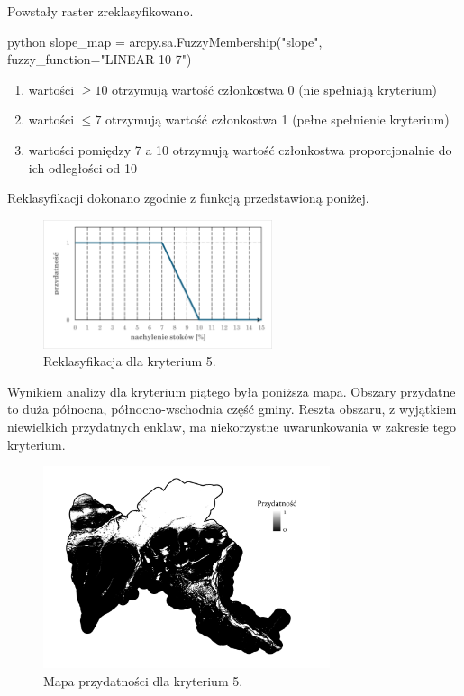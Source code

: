 \documentclass{article}
\begin{document}
Powstały raster zreklasyfikowano.
\vspace{5pt}

\begin{mintedbox}{python}
slope_map = arcpy.sa.FuzzyMembership("slope", fuzzy_function="LINEAR 10 7")
\end{mintedbox}

\begin{enumerate}[label=•]
    \item wartości \( \geq 10 \) otrzymują wartość członkostwa 0 (nie spełniają kryterium)
    \item wartości \( \leq 7 \) otrzymują wartość członkostwa 1 (pełne spełnienie kryterium)
    \item wartości pomiędzy 7 a 10 otrzymują wartość członkostwa proporcjonalnie do ich odległości od 10
\end{enumerate}
\vspace{10pt}

Reklasyfikacji dokonano zgodnie z funkcją przedstawioną poniżej.
\vspace{5pt}

\begin{figure}[H]
    \centering
    \includegraphics[width=0.6\textwidth]{img/kryterium5-wykres-glowny.png}
    \caption{Reklasyfikacja dla kryterium 5.}
\end{figure}
\vspace{10pt}

Wynikiem analizy dla kryterium piątego była poniższa mapa.
Obszary przydatne to duża północna, północno-wschodnia część gminy. Reszta obszaru, z wyjątkiem niewielkich przydatnych enklaw, ma niekorzystne uwarunkowania w zakresie tego kryterium.

\vspace{5pt}

\begin{figure}[H]
    \centering
    \includegraphics[width=0.75\textwidth]{img/kryterium5-layout.jpg}
    \caption{Mapa przydatności dla kryterium 5.}
\end{figure}
\vspace{10pt}
\end{document}
